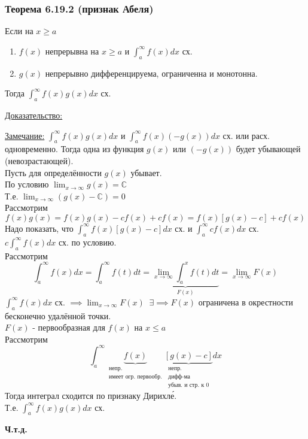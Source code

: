 \documentclass[12pt]{article}
\begin{document}
    \subsubsection*{Теорема 6.19.2 (признак Абеля)}\label{th:6.19.2}
    Если на $x\geq a$
    \begin{enumerate}
        \item $f(x)$ непрерывна на $x \geq a$ и $\int_{a}^{\infty}f(x)dx$ сх.
        \item $g(x)$ непрерывно дифференцируема, ограниченна и монотонна.
    \end{enumerate}
    Тогда $\int_{a}^{\infty}f(x)g(x)dx$ сх.\par\noindent
    \underline{Доказательство:}
    \begin{adjustwidth}{1.5em}{1.5em}
        \underline{Замечание:} $\int_{a}^{\infty}f(x)g(x)dx$ и $\int_{a}^{\infty}f(x)(-g(x))dx$ сх. или расх. одновременно. Тогда одна из функция $g(x)$ или $(-g(x))$ будет убывающей (невозрастающей).\\
        Пусть для определённости $g(x)$ убывает.\\
        По условию $\lim_{x \to \infty}g(x) = \mathbb{C}$\\
        Т.е. $\lim_{x \to \infty}(g(x) - \mathbb{C}) = 0$\\
        Рассмотрим 
        \[ f(x)g(x) = f(x)g(x)-cf(x)+cf(x)=f(x)[g(x)-c]+cf(x) \]
        Надо показать, что $\int_{a}^{\infty}f(x)[g(x)-c]dx$ сх. и $\int_{a}^{\infty}cf(x)dx$ сх.\\
        $c\int_{a}^{\infty}f(x)dx$ сх. по условию.\\
        Рассмотрим 
        \[ \int_{a}^{\infty}f(x)dx=\int_{a}^{\infty}f(t)dt= \underbrace{\lim_{x \to \infty}\int_{a}^{x}f(t)dt}_{F(x)} =\lim_{x \to \infty}F(x)\]
        $\int_{a}^{\infty}f(x)dx$ сх. $\implies \lim_{x \to \infty}F(x) \;\; \exists \implies F(x)$ ограничена в окрестности бесконечно удалённой точки.\\
        $F(x)$ - первообразная для $f(x)$ на $x \leq a$\\
        Рассмотрим 
        \[ \int_{a}^{\infty} \underbrace{f(x)}_{\substack{\text{непр.}\\\text{имеет огр. первообр.}}} \underbrace{[g(x)-c]}_{\substack{\text{непр.}\\\text{дифф-ма}\\\text{убыв. и стр. к 0}}}dx\] 
        Тогда интеграл сходится по признаку Дирихле́.\\
        Т.е. $\int_{a}^{\infty}f(x)g(x)dx$ сх.
        \begin{center}
            \textbf{Ч.т.д.}
        \end{center}
    \end{adjustwidth}
\end{document}
